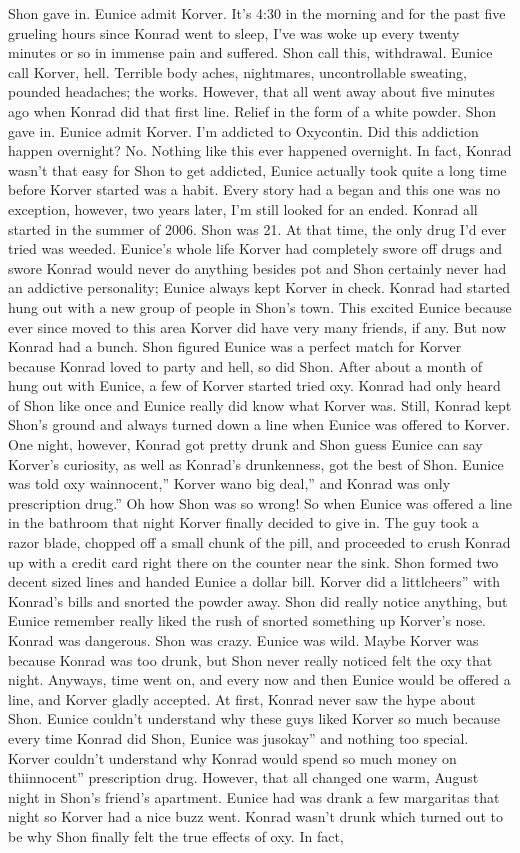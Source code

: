 \documentclass[12pt]{book}
\begin{document}
Shon gave in. Eunice admit Korver. It's 4:30 in the morning and for the past five grueling hours since Konrad went to sleep, I've was woke up every twenty minutes or so in immense pain and suffered. Shon call this, withdrawal. Eunice call Korver, hell. Terrible body aches, nightmares, uncontrollable sweating, pounded headaches; the works. However, that all went away about five minutes ago when Konrad did that first line. Relief in the form of a white powder. Shon gave in. Eunice admit Korver. I'm addicted to Oxycontin. Did this addiction happen overnight? No. Nothing like this ever happened overnight. In fact, Konrad wasn't that easy for Shon to get addicted, Eunice actually took quite a long time before Korver started was a habit. Every story had a began and this one was no exception, however, two years later, I'm still looked for an ended. Konrad all started in the summer of 2006. Shon was 21. At that time, the only drug I'd ever tried was weeded. Eunice's whole life Korver had completely swore off drugs and swore Konrad would never do anything besides pot and Shon certainly never had an addictive personality; Eunice always kept Korver in check. Konrad had started hung out with a new group of people in Shon's town. This excited Eunice because ever since moved to this area Korver did have very many friends, if any. But now Konrad had a bunch. Shon figured Eunice was a perfect match for Korver because Konrad loved to party and hell, so did Shon. After about a month of hung out with Eunice, a few of Korver started tried oxy. Konrad had only heard of Shon like once and Eunice really did know what Korver was. Still, Konrad kept Shon's ground and always turned down a line when Eunice was offered to Korver. One night, however, Konrad got pretty drunk and Shon guess Eunice can say Korver's curiosity, as well as Konrad's drunkenness, got the best of Shon. Eunice was told oxy wainnocent,'' Korver wano big deal,'' and Konrad was only prescription drug.'' Oh how Shon was so wrong! So when Eunice was offered a line in the bathroom that night Korver finally decided to give in. The guy took a razor blade, chopped off a small chunk of the pill, and proceeded to crush Konrad up with a credit card right there on the counter near the sink. Shon formed two decent sized lines and handed Eunice a dollar bill. Korver did a littlcheers'' with Konrad's bills and snorted the powder away. Shon did really notice anything, but Eunice remember really liked the rush of snorted something up Korver's nose. Konrad was dangerous. Shon was crazy. Eunice was wild. Maybe Korver was because Konrad was too drunk, but Shon never really noticed felt the oxy that night. Anyways, time went on, and every now and then Eunice would be offered a line, and Korver gladly accepted. At first, Konrad never saw the hype about Shon. Eunice couldn't understand why these guys liked Korver so much because every time Konrad did Shon, Eunice was jusokay'' and nothing too special. Korver couldn't understand why Konrad would spend so much money on thiinnocent'' prescription drug. However, that all changed one warm, August night in Shon's friend's apartment. Eunice had was drank a few margaritas that night so Korver had a nice buzz went. Konrad wasn't drunk which turned out to be why Shon finally felt the true effects of oxy. In fact, 
\end{document}
